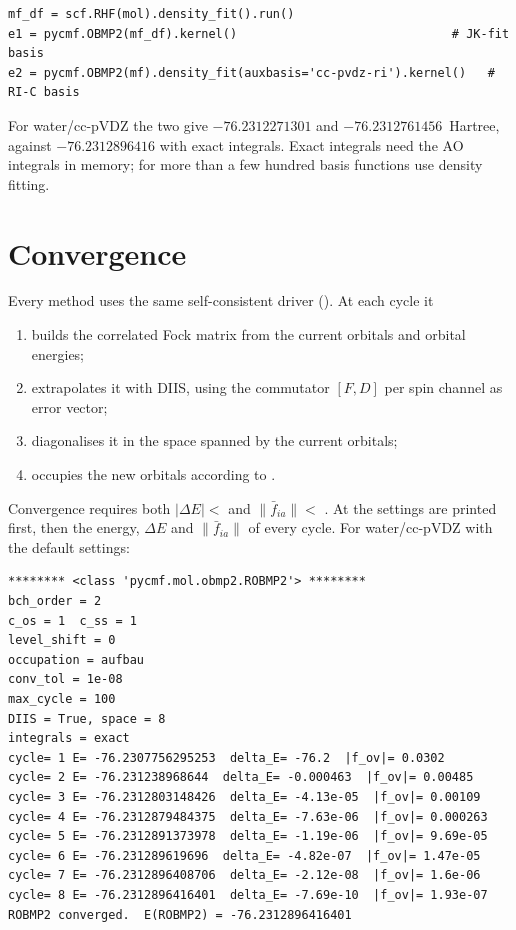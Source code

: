\begin{lstlisting}[style=python]
mf_df = scf.RHF(mol).density_fit().run()
e1 = pycmf.OBMP2(mf_df).kernel()                              # JK-fit basis
e2 = pycmf.OBMP2(mf).density_fit(auxbasis='cc-pvdz-ri').kernel()   # RI-C basis
\end{lstlisting}

For water/cc-pVDZ the two give $-76.2312271301$ and $-76.2312761456$~Hartree,
against $-76.2312896416$ with exact integrals. Exact integrals need the AO
integrals in memory; for more than a few hundred basis functions use density
fitting.

\section{Convergence}
\label{sec:convergence}

Every method uses the same self-consistent driver
(). At each cycle it

\begin{enumerate}
  \item builds the correlated Fock matrix from the current orbitals and
        orbital energies;
  \item extrapolates it with DIIS, using the commutator $[F,D]$ per spin
        channel as error vector;
  \item diagonalises it in the space spanned by the current orbitals;
  \item occupies the new orbitals according to .
\end{enumerate}

Convergence requires both $|\Delta E| <$  and
$\|\bar f_{ia}\| <$ . At  the
settings are printed first, then the energy, $\Delta E$ and
$\|\bar f_{ia}\|$ of every cycle. For water/cc-pVDZ with the default settings:

\begin{lstlisting}[style=output]
******** <class 'pycmf.mol.obmp2.ROBMP2'> ********
bch_order = 2
c_os = 1  c_ss = 1
level_shift = 0
occupation = aufbau
conv_tol = 1e-08
max_cycle = 100
DIIS = True, space = 8
integrals = exact
cycle= 1 E= -76.2307756295253  delta_E= -76.2  |f_ov|= 0.0302
cycle= 2 E= -76.231238968644  delta_E= -0.000463  |f_ov|= 0.00485
cycle= 3 E= -76.2312803148426  delta_E= -4.13e-05  |f_ov|= 0.00109
cycle= 4 E= -76.2312879484375  delta_E= -7.63e-06  |f_ov|= 0.000263
cycle= 5 E= -76.2312891373978  delta_E= -1.19e-06  |f_ov|= 9.69e-05
cycle= 6 E= -76.231289619696  delta_E= -4.82e-07  |f_ov|= 1.47e-05
cycle= 7 E= -76.2312896408706  delta_E= -2.12e-08  |f_ov|= 1.6e-06
cycle= 8 E= -76.2312896416401  delta_E= -7.69e-10  |f_ov|= 1.93e-07
ROBMP2 converged.  E(ROBMP2) = -76.2312896416401
\end{lstlisting}

